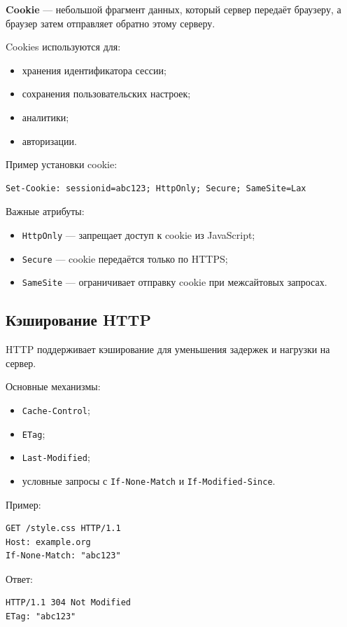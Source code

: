 \documentclass[12pt,a4paper]{article}
\begin{document}
\textbf{Cookie} --- небольшой фрагмент данных, который сервер передаёт браузеру, а браузер затем отправляет обратно этому серверу.

Cookies используются для:
\begin{itemize}
    \item хранения идентификатора сессии;
    \item сохранения пользовательских настроек;
    \item аналитики;
    \item авторизации.
\end{itemize}

Пример установки cookie:
\begin{lstlisting}
Set-Cookie: sessionid=abc123; HttpOnly; Secure; SameSite=Lax
\end{lstlisting}

Важные атрибуты:
\begin{itemize}
    \item \texttt{HttpOnly} --- запрещает доступ к cookie из JavaScript;
    \item \texttt{Secure} --- cookie передаётся только по HTTPS;
    \item \texttt{SameSite} --- ограничивает отправку cookie при межсайтовых запросах.
\end{itemize}

\subsection{Кэширование HTTP}

HTTP поддерживает кэширование для уменьшения задержек и нагрузки на сервер.

Основные механизмы:
\begin{itemize}
    \item \texttt{Cache-Control};
    \item \texttt{ETag};
    \item \texttt{Last-Modified};
    \item условные запросы с \texttt{If-None-Match} и \texttt{If-Modified-Since}.
\end{itemize}

Пример:
\begin{lstlisting}
GET /style.css HTTP/1.1
Host: example.org
If-None-Match: "abc123"
\end{lstlisting}

Ответ:
\begin{lstlisting}
HTTP/1.1 304 Not Modified
ETag: "abc123"
\end{lstlisting}
\end{document}
